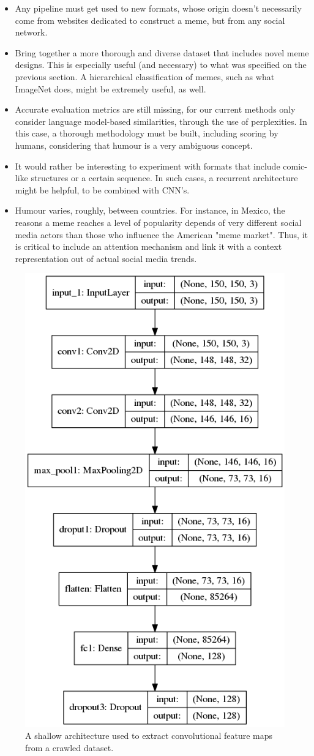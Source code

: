 \documentclass[paper=letter, fontsize=11pt]{scrartcl}
\begin{document}
\begin{itemize}
    \item Any pipeline must get used to new formats, whose origin doesn't necessarily come from websites dedicated to construct a meme, but from any social network. 
    \item Bring together a more thorough and diverse dataset that includes novel meme designs. This is especially useful (and necessary) to what was specified on the previous section. A hierarchical classification of memes, such as what ImageNet does, might be extremely useful, as well.
    \item Accurate evaluation metrics are still missing, for our current methods only consider language model-based similarities, through the use of perplexities. In this case, a thorough methodology must be built, including scoring by humans, considering that humour is a very ambiguous concept.
    \item It would rather be interesting to experiment with formats that include comic-like structures or a certain sequence. In such cases, a recurrent architecture might be helpful, to be combined with CNN's.
    \item Humour varies, roughly, between countries. For instance, in Mexico, the reasons a meme reaches a level of popularity depends of very different social media actors than those who influence the American "meme market". Thus, it is critical to include an attention mechanism and link it with a context representation out of actual social media trends.
\end{itemize}

\printbibliography[title={Bibliography}]

\newpage


  \begin{figure}[h]
    \centering
    \includegraphics[width=0.45\linewidth]{img/model.png}
    \caption{
        A shallow architecture used to extract convolutional feature maps from a crawled dataset.
    }
    \label{fig3}
\end{figure}
\end{document}
